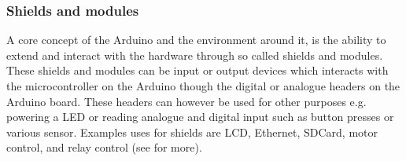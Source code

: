 \subsubsection{Shields and modules}
A core concept of the Arduino and the environment around it, is the ability to extend and interact with the hardware through so called shields and modules.
These shields and modules can be input or output devices which interacts with the microcontroller on the Arduino though the digital or analogue headers on the Arduino board.
These headers can however be used for other purposes e.g. powering a LED or reading analogue and digital input such as button presses or various sensor.
Examples uses for shields are LCD, Ethernet, SDCard, motor control, and relay control (see \cite{ArduinoShields} for more).
